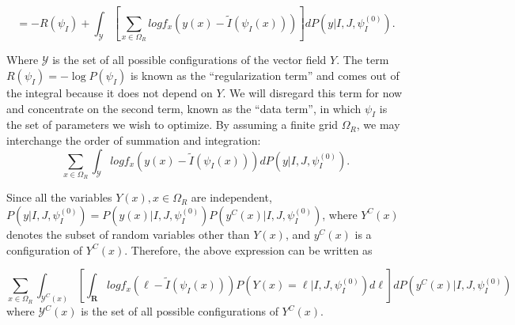 \begin{equation}
    =-R(\psi_{I}) + \int_{\mathcal{Y}}\left[\sum_{x\in\Omega_{R}} log f_{x}\left(y(x) - \tilde{I}(\psi_{I}(x))\right) \right] dP(y | I, J, \psi^{(0)}_{I}).
\end{equation}

Where $\mathcal{Y}$ is the set of all possible configurations of the vector field $Y$. The term $R(\psi_{I}) = -\log P(\psi_{I})$ is known as the ``regularization term'' and comes out of the
integral because it does not depend on $Y$. We will disregard this term for now and concentrate on the second term, known as the ``data term'', in which $\psi_{I}$ is the
set of parameters we wish to optimize. By assuming a finite grid $\Omega_{R}$, we may interchange the order of summation and integration:
\begin{equation}
    \sum_{x\in\Omega_{R}} \int_{\mathcal{Y}} log f_{x}\left(y(x) - \tilde{I}(\psi_{I}(x))\right)  dP(y | I, J, \psi^{(0)}_{I}).
\end{equation}

Since all the variables $Y(x), x\in\Omega_{R}$ are independent, $P(y | I, J, \psi^{(0)}_{I}) = P(y(x)| I, J, \psi^{(0)}_{I})P(y^{C}(x) | I, J, \psi^{(0)}_{I})$, where $Y^{C}(x)$ denotes
the subset of random variables other than $Y(x)$, and $y^{C}(x)$ is a configuration of $Y^{C}(x)$. Therefore, the above expression can be written as

\begin{equation}
    \sum_{x\in\Omega_{R}} \int_{\mathcal{Y}^{C}(x)} \left[\int_{\mathbf{R}} log f_{x}\left(\ell - \tilde{I}(\psi_{I}(x))\right) P(Y(x) = \ell | I, J, \psi^{(0)}_{I})d\ell\right]  dP(y^{C}(x) | I, J, \psi^{(0)}_{I})
\end{equation}
where $\mathcal{Y}^{C}(x)$ is the set of all possible configurations of $Y^{C}(x)$.\\

